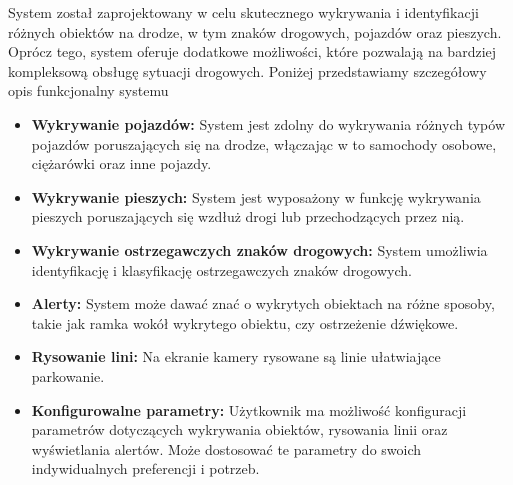 \label{funkcjonalne}
System został zaprojektowany w celu skutecznego wykrywania i identyfikacji 
różnych obiektów na drodze, w tym znaków drogowych, pojazdów oraz pieszych. 
Oprócz tego, system oferuje dodatkowe możliwości, które pozwalają na bardziej 
kompleksową obsługę sytuacji drogowych. Poniżej przedstawiamy szczegółowy 
opis funkcjonalny systemu

\begin{itemize}
    \item \textbf{Wykrywanie pojazdów:} System jest zdolny do wykrywania różnych
     typów pojazdów poruszających się na drodze, włączając w to samochody osobowe, 
     ciężarówki oraz inne pojazdy.
    
     \item \textbf{Wykrywanie pieszych:} System jest wyposażony w funkcję wykrywania pieszych 
    poruszających się wzdłuż drogi lub przechodzących przez nią. 
    
    \item \textbf{Wykrywanie ostrzegawczych znaków drogowych:} System umożliwia identyfikację i klasyfikację 
    ostrzegawczych znaków drogowych.

    \item \textbf{Alerty:} System może dawać znać o wykrytych obiektach na różne sposoby, 
    takie jak ramka wokół wykrytego obiektu, czy ostrzeżenie dźwiękowe. 
    
    \item \textbf{Rysowanie lini:} Na ekranie kamery rysowane są linie ułatwiające parkowanie.

    \item \textbf{Konfigurowalne parametry:} Użytkownik ma możliwość konfiguracji parametrów dotyczących 
    wykrywania obiektów, rysowania linii oraz wyświetlania alertów. 
    Może dostosować te parametry do swoich indywidualnych preferencji i potrzeb.

\end{itemize}